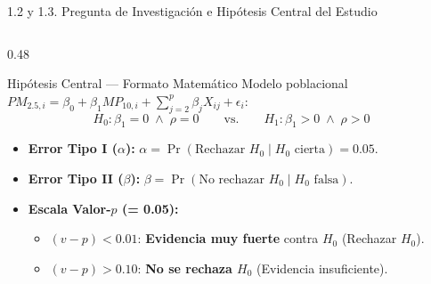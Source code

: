\documentclass[aspectratio=169, 9pt]{beamer}
\begin{document}
\begin{frame}{1.2 y 1.3. Pregunta de Investigación e Hipótesis Central del Estudio}
\begin{columns}[T]
  \begin{column}{0.48\textwidth}
    \begin{exampleblock}{\footnotesize Hipótesis Central — Formato Matemático}
      \scriptsize
      Modelo poblacional $PM_{2.5, i} = \beta_0 + \beta_1 MP_{10, i} + \sum_{j=2}^p \beta_j X_{ij} + \epsilon_i$:
      $$H_0: \beta_1 = 0 \;\wedge\; \rho = 0 \qquad \text{vs.} \qquad H_1: \beta_1 > 0 \;\wedge\; \rho > 0$$
      \begin{itemize}\setlength{\itemsep}{1.5pt}
        \item \textbf{Error Tipo I ($\alpha$):} $\alpha = \Pr(\text{Rechazar } H_0 \mid H_0 \text{ cierta}) = 0.05$.
        \item \textbf{Error Tipo II ($\beta$):} $\beta = \Pr(\text{No rechazar } H_0 \mid H_0 \text{ falsa})$.
        \item \textbf{Escala Valor-$p$ (\alpha = 0.05):}
        \begin{itemize}\scriptsize
          \item $(v-p) < 0.01$: \textbf{Evidencia muy fuerte} contra $H_0$ (Rechazar $H_0$).
          \item $(v-p) > 0.10$: \textbf{No se rechaza $H_0$} (Evidencia insuficiente).
        \end{itemize}
      \end{itemize}
    \end{exampleblock}
  \end{column}
\end{columns}
\end{frame}
\end{document}
